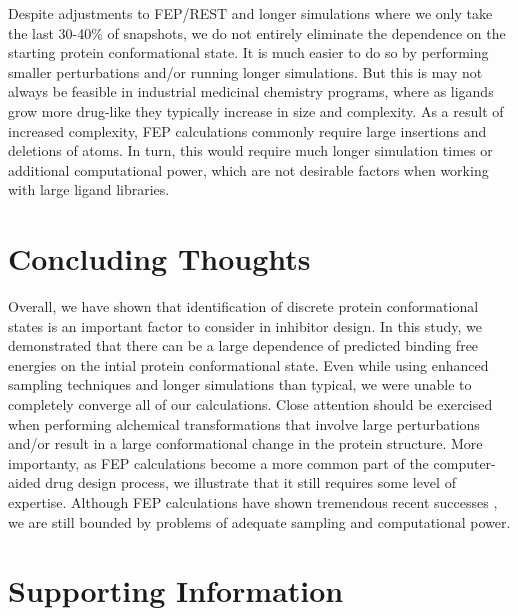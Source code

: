 \documentclass{article}
\begin{document}
Despite adjustments to FEP/REST and longer simulations where we only take the last 30-40\% of snapshots, we do not entirely eliminate the dependence on the starting protein conformational state.
It is much easier to do so by performing smaller perturbations and/or running longer simulations. %
But this is may not always be feasible in industrial medicinal chemistry programs, where as ligands grow more drug-like they typically increase in size and complexity.
As a result of increased complexity, FEP calculations commonly require large insertions and deletions of atoms.
In turn, this would require much longer simulation times or additional computational power, which are not desirable factors when working with large ligand libraries.

\section{Concluding Thoughts}
Overall, we have shown that identification of discrete protein conformational states is an important factor to consider in inhibitor design.
In this study, we demonstrated that there can be a large dependence of predicted binding free energies on the intial protein conformational state.
Even while using enhanced sampling techniques and longer simulations than typical, we were unable to completely converge all of our calculations.
Close attention should be exercised when performing alchemical transformations that involve large perturbations and/or result in a large conformational change in the protein structure.
More importanty, as FEP calculations become a more common part of the computer-aided drug design process, we illustrate that it still requires some level of expertise.
Although FEP calculations have shown tremendous recent successes \cite{FEPplus}, we are still bounded by problems of adequate sampling and computational power.

\pagebreak
\section{Supporting Information}
\end{document}
